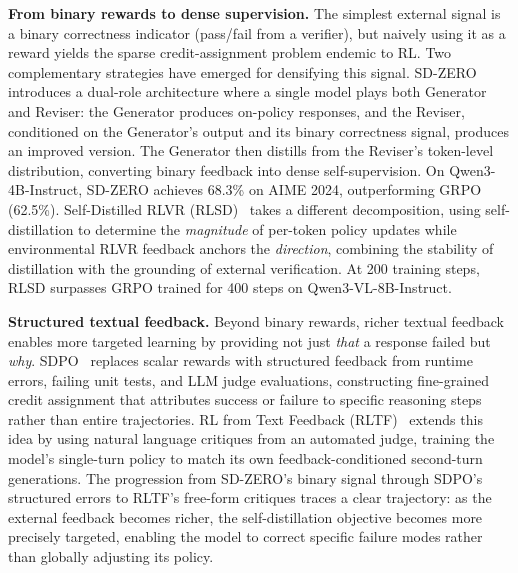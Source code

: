 \documentclass{article} %
\begin{document}
\textbf{From binary rewards to dense supervision.}
The simplest external signal is a binary correctness indicator (pass/fail from a verifier), but naively using it as a reward yields the sparse credit-assignment problem endemic to RL. Two complementary strategies have emerged for densifying this signal. SD-ZERO~\citep{he2026selfdistillation} introduces a dual-role architecture where a single model plays both Generator and Reviser: the Generator produces on-policy responses, and the Reviser, conditioned on the Generator's output and its binary correctness signal, produces an improved version. The Generator then distills from the Reviser's token-level distribution, converting binary feedback into dense self-supervision. On Qwen3-4B-Instruct, SD-ZERO achieves 68.3\% on AIME 2024, outperforming GRPO (62.5\%). Self-Distilled RLVR (RLSD)~\citep{yang2026selfdistilled} takes a different decomposition, using self-distillation to determine the \emph{magnitude} of per-token policy updates while environmental RLVR feedback anchors the \emph{direction}, combining the stability of distillation with the grounding of external verification. At 200 training steps, RLSD surpasses GRPO trained for 400 steps on Qwen3-VL-8B-Instruct.

\textbf{Structured textual feedback.}
Beyond binary rewards, richer textual feedback enables more targeted learning by providing not just \emph{that} a response failed but \emph{why}. SDPO~\citep{2601.20802} replaces scalar rewards with structured feedback from runtime errors, failing unit tests, and LLM judge evaluations, constructing fine-grained credit assignment that attributes success or failure to specific reasoning steps rather than entire trajectories. RL from Text Feedback (RLTF)~\citep{song2026expanding} extends this idea by using natural language critiques from an automated judge, training the model's single-turn policy to match its own feedback-conditioned second-turn generations. The progression from SD-ZERO's binary signal through SDPO's structured errors to RLTF's free-form critiques traces a clear trajectory: as the external feedback becomes richer, the self-distillation objective becomes more precisely targeted, enabling the model to correct specific failure modes rather than globally adjusting its policy.
\end{document}
